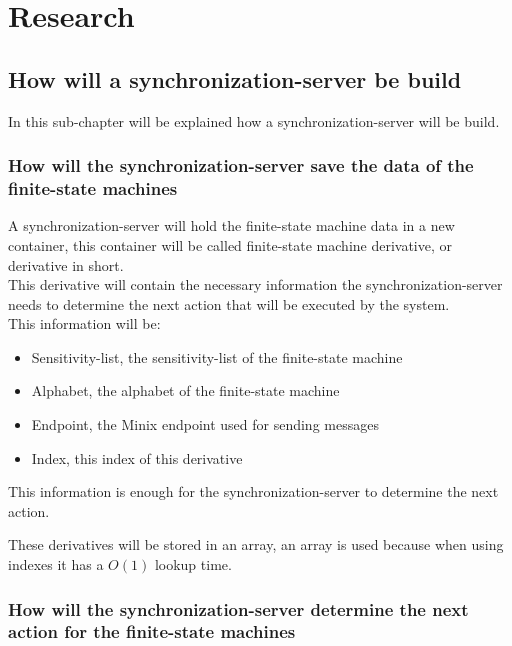 \hypertarget{research}{%
\section{Research}\label{research}}

\hypertarget{how-will-a-synchronization-server-be-build}{%
\subsection{How will a synchronization-server be
build}\label{how-will-a-synchronization-server-be-build}}

In this sub-chapter will be explained how a synchronization-server will
be build.

\hypertarget{how-will-the-synchronization-server-save-the-data-of-the-finite-state-machines}{%
\subsubsection{How will the synchronization-server save the data of the
finite-state
machines}\label{how-will-the-synchronization-server-save-the-data-of-the-finite-state-machines}}

A synchronization-server will hold the finite-state machine data in a
new container, this container will be called finite-state machine
derivative, or derivative in short.\\
This derivative will contain the necessary information the
synchronization-server needs to determine the next action that will be
executed by the system.\\
This information will be:

\begin{itemize}
\tightlist
\item
  Sensitivity-list, the sensitivity-list of the finite-state machine
\item
  Alphabet, the alphabet of the finite-state machine
\item
  Endpoint, the Minix endpoint used for sending messages
\item
  Index, this index of this derivative
\end{itemize}

This information is enough for the synchronization-server to determine
the next action.

These derivatives will be stored in an array, an array is used because
when using indexes it has a \(O (1)\) lookup time.

\hypertarget{how-will-the-synchronization-server-determine-the-next-action-for-the-finite-state-machines}{%
\subsubsection{How will the synchronization-server determine the next
action for the finite-state
machines}\label{how-will-the-synchronization-server-determine-the-next-action-for-the-finite-state-machines}}

